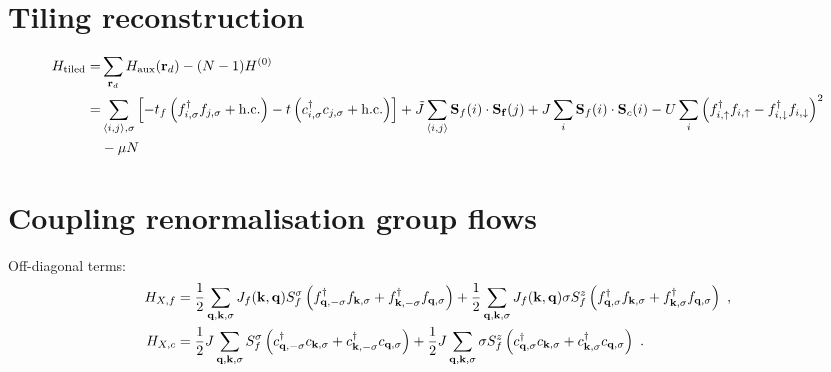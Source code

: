 \documentclass[%
reprint,
superscriptaddress,
groupedaddress,
superscriptaddress,
onecolumn,
10pt
]{revtex4-2}
\begin{document}
\section{Tiling reconstruction}
\begin{equation}\begin{aligned}
	H_\text{tiled} =& \sum_{{\bf r}_d}H_\text{aux}({\bf r}_d) - (N-1) H^{(0)} \\
	=& \sum_{\braket{i,j},\sigma}\left[-t_f\left(f^\dagger_{i,\sigma}f_{j,\sigma} + \text{h.c.}\right) -t\left(c^\dagger_{i,\sigma}c_{j,\sigma} + \text{h.c.}\right)\right] + \tilde J \sum_{\braket{i,j}}{\bf S}_f(i) \cdot {\bf S_f}(j) + J\sum_i {\bf S}_f(i)\cdot {\bf S}_c(i) - U\sum_i \left(f^\dagger_{i,\uparrow}f_{i,\uparrow} - f^\dagger_{i,\downarrow}f_{i,\downarrow}\right)^2 \\
	 &- \mu N
\end{aligned}\end{equation}

\section{Coupling renormalisation group flows}
Off-diagonal terms:
\begin{equation}\begin{aligned}
	H_{X, f} &= \frac{1}{2}\sum_{{\bf q},{\bf k},\sigma}J_f({\bf k},{\bf q}) S_f^\sigma \left(f^\dagger_{{\bf q},-\sigma}f_{{\bf k},\sigma} + f^\dagger_{{\bf k},-\sigma}f_{{\bf q},\sigma}\right) + \frac{1}{2}\sum_{{\bf q},{\bf k},\sigma}J_f({\bf k},{\bf q}) \sigma S_f^z \left(f^\dagger_{{\bf q},\sigma}f_{{\bf k},\sigma} + f^\dagger_{{\bf k},\sigma}f_{{\bf q},\sigma}\right)~,\\
	H_{X, c} &= \frac{1}{2}J\sum_{{\bf q},{\bf k},\sigma} S_f^\sigma \left(c^\dagger_{{\bf q},-\sigma}c_{{\bf k},\sigma} + c^\dagger_{{\bf k},-\sigma}c_{{\bf q},\sigma}\right) + \frac{1}{2}J\sum_{{\bf q},{\bf k},\sigma} \sigma S_f^z \left(c^\dagger_{{\bf q},\sigma}c_{{\bf k},\sigma} + c^\dagger_{{\bf k},\sigma}c_{{\bf q},\sigma}\right)~.
\end{aligned}\end{equation}
\end{document}
